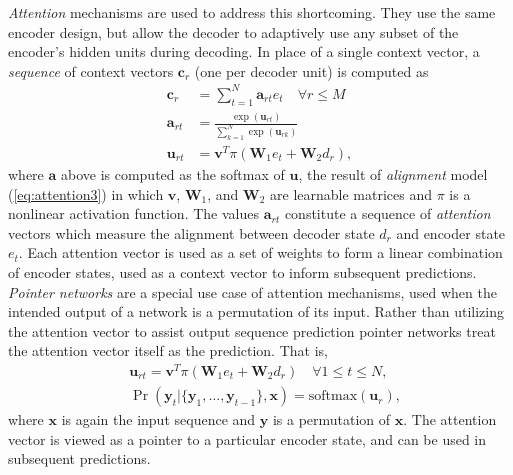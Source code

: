 \emph{Attention} mechanisms  are used to address this shortcoming. They use the same encoder design, but allow the decoder to adaptively use any subset of the encoder's hidden units during decoding. 
In place of a single context vector, a \emph{sequence} of context vectors $\bm{c}_r$ (one per decoder unit) is computed as 
\begin{subequations}
\begin{flalign}
\label{eq:attention1}
    \bm{c}_r &= \textstyle \sum_{t = 1}^N \bm{a}_{rt} e_t  \quad \forall r \leq M\\
\label{eq:attention2}
   \bm{a}_{rt} &= \textstyle \frac{ \exp(\bm{u}_{rt}) }{  \sum_{k=1}^N \exp(\bm{u}_{rk})  }\\
\label{eq:attention3}
   \bm{u}_{rt} &= \bm{v}^T \pi(\bm{W}_1 e_t + \bm{W}_2 d_r), 
\end{flalign}
\end{subequations}
where $\bm{a}$ above is computed as the softmax of $\bm{u}$, the result of \emph{alignment} model (\ref{eq:attention3}) in which $\bm{v}$, $\bm{W}_1$, and $\bm{W}_2$ are learnable matrices and $\pi$ is a nonlinear activation function. The values $\bm{a}_{rt}$ constitute a sequence of \emph{attention} vectors which measure the alignment between decoder state $d_r$ and encoder state $e_t$. Each attention vector is used as a set of weights to form a linear combination of encoder states, used as a context vector to inform subsequent predictions.
\emph{Pointer networks}   are a special use case of attention mechanisms, used when the intended output of a network is a permutation of its input. Rather than utilizing the attention vector to assist output sequence prediction pointer networks treat the attention vector itself as the prediction. That is, 
\begin{align*}
	&\bm{u}_{rt} = \bm{v}^T \pi(\bm{W}_1 e_t + \bm{W}_2 d_r) 
	\quad \forall 1 \leq t \leq N, \\
	&\Pr(\bm{y}_t | \{ \bm{y}_1, \ldots, \bm{y}_{t-1} \}, \bm{x})  
	= \text{softmax}( \bm{u}_r ),
\end{align*}
where $\bm{x}$ is again the input sequence and $\bm{y}$ is a permutation of $\bm{x}$. The attention vector is viewed as a pointer to a particular encoder state, and can be used in subsequent predictions.

